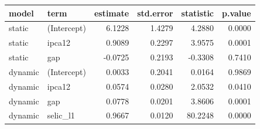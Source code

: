 
\begin{tabular}{llrrrr}
\toprule
model & term & estimate & std.error & statistic & p.value\\
\midrule
static & (Intercept) & 6.1228 & 1.4279 & 4.2880 & 0.0000\\
static & ipca12 & 0.9089 & 0.2297 & 3.9575 & 0.0001\\
static & gap & -0.0725 & 0.2193 & -0.3308 & 0.7410\\
dynamic & (Intercept) & 0.0033 & 0.2041 & 0.0164 & 0.9869\\
dynamic & ipca12 & 0.0574 & 0.0280 & 2.0532 & 0.0410\\
\addlinespace
dynamic & gap & 0.0778 & 0.0201 & 3.8606 & 0.0001\\
dynamic & selic\_l1 & 0.9667 & 0.0120 & 80.2248 & 0.0000\\
\bottomrule
\end{tabular}
